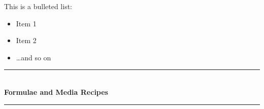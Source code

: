 \documentclass[idxtotoc,hyperref,openany]{labbook} %
\newcommand{\HRule}{\rule{\linewidth}{0.5mm}} %
\begin{document}





This is a bulleted list:

\begin{itemize}
\item Item 1
\item Item 2
\item \ldots and so on
\end{itemize}



\lipsum[6]



\lipsum[7]


\labday{} %

\begin{center}
\HRule \\[0.4cm]
{\huge \textbf{Formulae and Media Recipes}}\\[0.4cm] %
\HRule \\[1.5cm]
\end{center}
\end{document}
